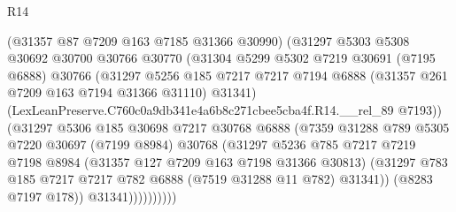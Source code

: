 \begin{lexlean}{R14}
\begin{coremodule}
                            (@31357 @87 @7209 @163 @7185 @31366 @30990)
                            (@31297
                              @5303
                              @5308
                              @30692
                              @30700
                              @30766
                              @30770
                              (@31304
                                @5299
                                @5302
                                @7219
                                @30691
                                (@7195 @6888)
                                @30766
                                (@31297
                                  @5256
                                  @185
                                  @7217
                                  @7217
                                  @7194
                                  @6888
                                  (@31357 @261 @7209 @163 @7194 @31366 @31110)
                                  @31341)
                                (LexLeanPreserve.C760c0a9db341e4a6b8c271cbee5cba4f.R14.__rel_89
                                  @7193))
                              (@31297
                                @5306
                                @185
                                @30698
                                @7217
                                @30768
                                @6888
                                (@7359
                                  @31288
                                  @789
                                  @5305
                                  @7220
                                  @30697
                                  (@7199 @8984)
                                  @30768
                                  (@31297
                                    @5236
                                    @785
                                    @7217
                                    @7219
                                    @7198
                                    @8984
                                    (@31357 @127 @7209 @163 @7198 @31366 @30813)
                                    (@31297
                                      @783
                                      @185
                                      @7217
                                      @7217
                                      @782
                                      @6888
                                      (@7519 @31288 @11 @782)
                                      @31341))
                                  (@8283 @7197 @178))
                                @31341))))))))))

\end{coremodule}
\end{lexlean}
